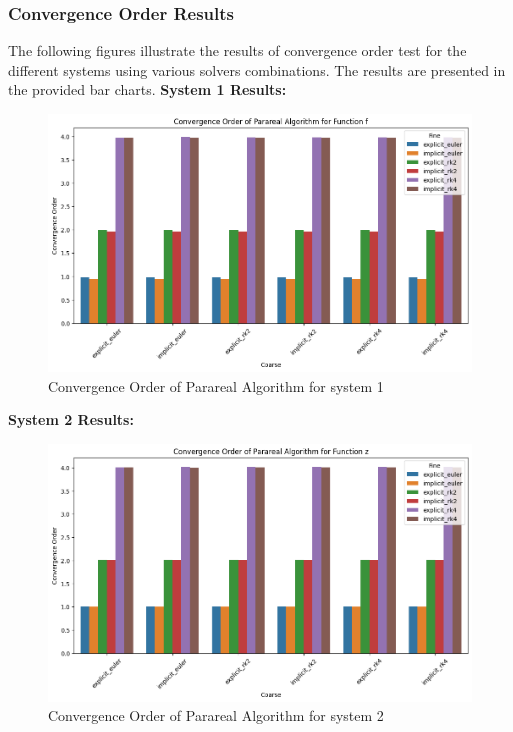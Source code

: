 \documentclass[a4paper,12pt,french]{article}
\begin{document}
\subsubsection{Convergence Order Results}
The following figures illustrate the results of convergence order test for the different systems using various solvers combinations. The results are presented in the provided bar charts.
\newline
\newpage
\textbf{System 1 Results:}
\begin{figure}[ht!]
    \centering
    \includegraphics[width=.92\textwidth]{img/cv_ord_f.png}
    \caption{Convergence Order of Parareal Algorithm for system 1}
    \label{fig:4}
\end{figure}

\textbf{System 2 Results:}
\begin{figure}[ht!]
    \centering
    \includegraphics[width=.92\textwidth]{img/cv_ord_z.png}
    \caption{Convergence Order of Parareal Algorithm for system 2}
    \label{fig:5}
\end{figure}
\newline
\end{document}
